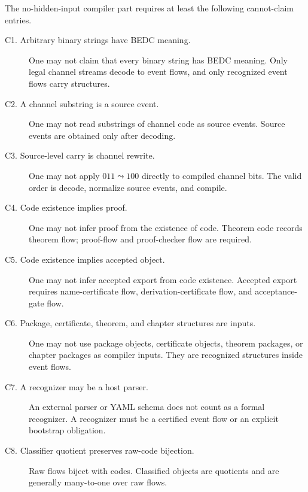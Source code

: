 \begin{definition}
\label{def:main-theorems-required-cannot-claims}
The no-hidden-input compiler part requires at least the following cannot-claim entries.

\begin{description}
\item[C1. Arbitrary binary strings have BEDC meaning.]
One may not claim that every binary string has BEDC meaning. Only legal channel streams decode to event flows, and only recognized event flows carry structures.

\item[C2. A channel substring is a source event.]
One may not read substrings of channel code as source events. Source events are obtained only after decoding.

\item[C3. Source-level carry is channel rewrite.]
One may not apply $011\leadsto 100$ directly to compiled channel bits. The valid order is decode, normalize source events, and compile.

\item[C4. Code existence implies proof.]
One may not infer proof from the existence of code. Theorem code records theorem flow; proof-flow and proof-checker flow are required.

\item[C5. Code existence implies accepted object.]
One may not infer accepted export from code existence. Accepted export requires name-certificate flow, derivation-certificate flow, and acceptance-gate flow.

\item[C6. Package, certificate, theorem, and chapter structures are inputs.]
One may not use package objects, certificate objects, theorem packages, or chapter packages as compiler inputs. They are recognized structures inside event flows.

\item[C7. A recognizer may be a host parser.]
An external parser or YAML schema does not count as a formal recognizer. A recognizer must be a certified event flow or an explicit bootstrap obligation.

\item[C8. Classifier quotient preserves raw-code bijection.]
Raw flows biject with codes. Classified objects are quotients and are generally many-to-one over raw flows.


\end{description}
\end{definition}
